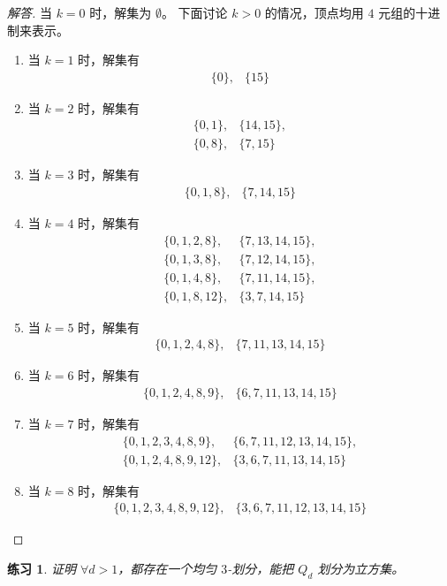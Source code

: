 \documentclass[12pt, a4paper]{article}
\newtheorem{exercisewithanswer}{练习}
\newenvironment{answer}[1][Answer]{
	\begin{proof}[#1]
	\let\qed\relax
}{
	\end{proof}
}
\begin{document}
\begin{answer}[解答]
当 $k = 0$ 时，解集为 $\emptyset$。
下面讨论 $k > 0$ 的情况，顶点均用 $4$ 元组的十进制来表示。
\begin{enumerate}[(1)]
	\item 当 $k = 1$ 时，解集有
		\begin{align*}
		\{0\}, & \{15\}
		\end{align*}
	\item 当 $k = 2$ 时，解集有
		\begin{align*}
		\{0, 1\}, & \{14, 15\}, \\
		\{0, 8\}, & \{7, 15\}
		\end{align*}
	\item 当 $k = 3$ 时，解集有
		\begin{align*}
		\{0, 1, 8\}, & \{7, 14, 15\}
		\end{align*}
	\item 当 $k = 4$ 时，解集有
		\begin{align*}
		\{0, 1, 2, 8\}, & \{7, 13, 14, 15\}, \\
		\{0, 1, 3, 8\}, & \{7, 12, 14, 15\}, \\
		\{0, 1, 4, 8\}, & \{7, 11, 14, 15\}, \\
		\{0, 1, 8, 12\}, & \{3, 7, 14, 15\}
		\end{align*}
	\item 当 $k = 5$ 时，解集有
		\begin{align*}
		\{0, 1, 2, 4, 8\}, & \{7, 11, 13, 14, 15\}
		\end{align*}
	\item 当 $k = 6$ 时，解集有
		\begin{align*}
		\{0, 1, 2, 4, 8, 9\}, & \{6, 7, 11, 13, 14, 15\}
		\end{align*}
	\item 当 $k = 7$ 时，解集有
		\begin{align*}
		\{0, 1, 2, 3, 4, 8, 9\}, & \{6, 7, 11, 12, 13, 14, 15\}, \\
		\{0, 1, 2, 4, 8, 9, 12\}, & \{3, 6, 7, 11, 13, 14, 15\}
		\end{align*}
	\item 当 $k = 8$ 时，解集有
		\begin{align*}
		\{0, 1, 2, 3, 4, 8, 9, 12\}, & \{3, 6, 7, 11, 12, 13, 14, 15\}
		\end{align*}
\end{enumerate}
\end{answer}

\begin{exercisewithanswer}
证明 $\forall d > 1$，都存在一个均匀 $3$-划分，能把 $Q_d$ 划分为立方集。
\end{exercisewithanswer}
\end{document}
